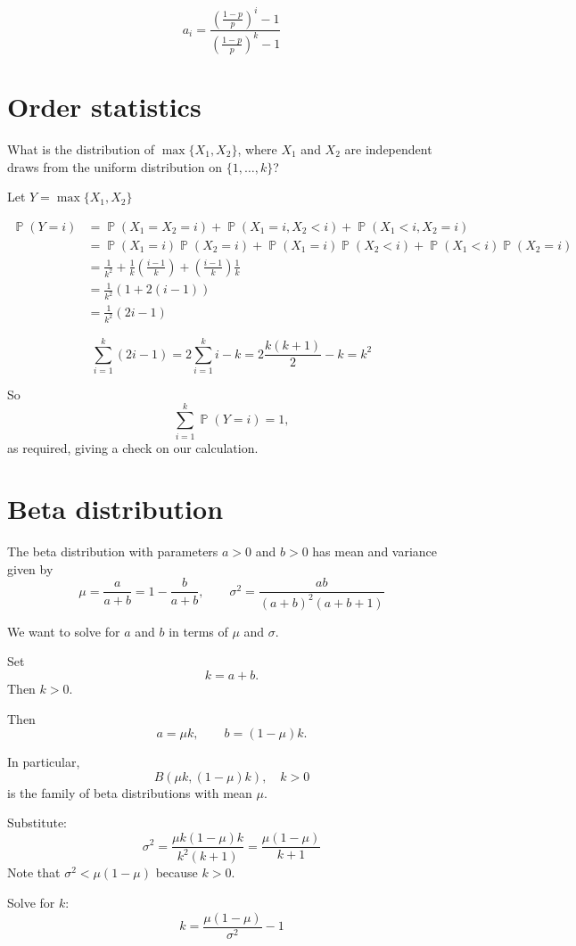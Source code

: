 \documentclass{amsart}
\DeclareMathOperator{\Prob}{\mathbb{P}}
\begin{document}
\[
a_i = \frac{\left(\frac{1 - p}{p}\right)^i - 1}{\left(\frac{1 - p}{p}\right)^k - 1}
\]

\section{Order statistics}
What is the distribution of $\max\{X_1, X_2\}$, where $X_1$ and $X_2$ are independent draws from the uniform distribution on $\{1,\ldots,k\}$?

Let $Y = \max\{X_1, X_2\}$

\begin{align*}
\Prob(Y = i) &= \Prob(X_1 = X_2 = i) + \Prob(X_1 = i, X_2 < i) + \Prob(X_1 < i, X_2 = i)\\
&= \Prob(X_1 = i)\Prob(X_2 = i) + \Prob(X_1 = i)\Prob(X_2 < i) + \Prob(X_1 < i)\Prob(X_2 = i)\\
&= \frac1{k^2} + \frac1k\left(\frac{i - 1}{k}\right) + \left(\frac{i - 1}{k}\right)\frac1k\\
&= \frac1{k^2}(1 + 2(i - 1))\\
&= \frac1{k^2}(2i - 1)
\end{align*}

\[
\sum_{i=1}^k(2i - 1) = 2\sum_{i=1}^ki - k = 2\frac{k(k+1)}{2} - k = k^2
\]

So
\[
\sum_{i=1}^k \Prob(Y = i) = 1,
\]
as required, giving a check on our calculation.

\section{Beta distribution}

The beta distribution with parameters $a > 0$ and $b > 0$ has mean and variance given by
\[
\mu = \frac{a}{a + b} = 1 - \frac{b}{a + b},\qquad
\sigma^2 = \frac{ab}{(a + b)^2(a + b + 1)}
\]

We want to solve for $a$ and $b$ in terms of $\mu$ and $\sigma$.

Set
\[
k = a + b.
\]
Then $k > 0$.

Then
\[
a = \mu k,\qquad
b = (1 - \mu)k.
\]

In particular,
\[
B(\mu k, (1 - \mu)k),\quad k > 0
\]
is the family of beta distributions with mean $\mu$.


Substitute:
\[
\sigma^2 = \frac{\mu k(1-\mu)k}{k^2(k + 1)}
= \frac{\mu(1 - \mu)}{k + 1}
\]
Note that $\sigma^2 < \mu(1 - \mu)$ because $k > 0$.

Solve for $k$:
\[
k = \frac{\mu(1 - \mu)}{\sigma^2} - 1
\]
\end{document}
